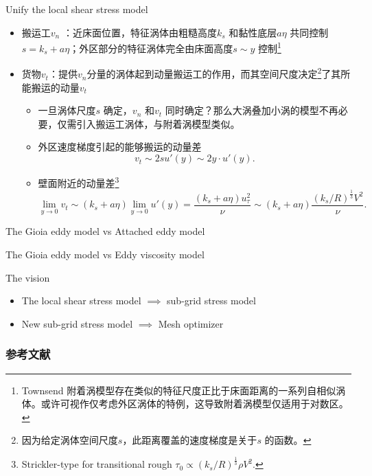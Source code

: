 \documentclass[10pt,xcolor={table,dvipsnames},t]{beamer}
\newcommand{\his}{\textsuperscript{\ddag}}
\begin{document}
\begin{frame}{Unify the local shear stress model}
    \begin{itemize}
        \item 搬运工$v_n$ ：近床面位置，特征涡体由粗糙高度$k_s$ 和黏性底层$a\eta$ 共同控制 $s = k_s + a\eta$\ddag；外区部分的特征涡体完全由床面高度$s\sim y$ 控制\footnote{Townsend 附着涡模型存在类似的特征尺度正比于床面距离的一系列自相似涡体。或许可视作仅考虑外区涡体的特例，这导致附着涡模型仅适用于对数区\cite{aemmarusic2019}。}
        \item 货物$v_t$\his ：提供$v_n$分量的涡体起到动量搬运工的作用，而其空间尺度决定\footnote{因为给定涡体空间尺度$s$，此距离覆盖的速度梯度是关于$s$ 的函数。}了其所能搬运的动量$v_t$ 
            \begin{itemize}
                \item 一旦涡体尺度$s$ 确定，$v_n$ 和$v_t$ 同时确定？那么大涡叠加小涡的模型不再必要，仅需引入搬运工涡体，与附着涡模型类似。
                \item 外区速度梯度引起的能够搬运的动量差 $$v_t \sim 2s u'(y) \sim 2y \cdot u'(y).$$
                \item 壁面附近的动量差\his \footnote{Strickler-type for transitional rough $\tau_0 \propto \left( k_s / R \right) ^{\frac{1}{3}} \rho V^2 $.}
                    $$\lim_{y \to 0} v_t \sim \left( k_s + a\eta \right) \lim_{y \to 0} u'(y) =  \frac{(k_s + a \eta)u_{\tau}^2}{\nu} \sim (k_s + a\eta) \frac{\left( k_s / R \right)^{\frac{1}{3}} V^2}{\nu}.$$
            \end{itemize}
    \end{itemize}
\end{frame}

\begin{frame}{The Gioia eddy model vs Attached eddy model}
    
\end{frame}

\begin{frame}{The Gioia eddy model vs Eddy viscosity model}
    
\end{frame}

\begin{frame}{The vision}
    \begin{itemize}
        \item The local shear stress model $\implies$ sub-grid stress model
        \item New sub-grid stress model $\implies$ Mesh optimizer
    \end{itemize}
\end{frame}

\begin{frame}[allowframebreaks]
  \frametitle{参考文献}
  \printbibliography[heading=bibliography,title=参考文献]
\end{frame}
\end{document}
